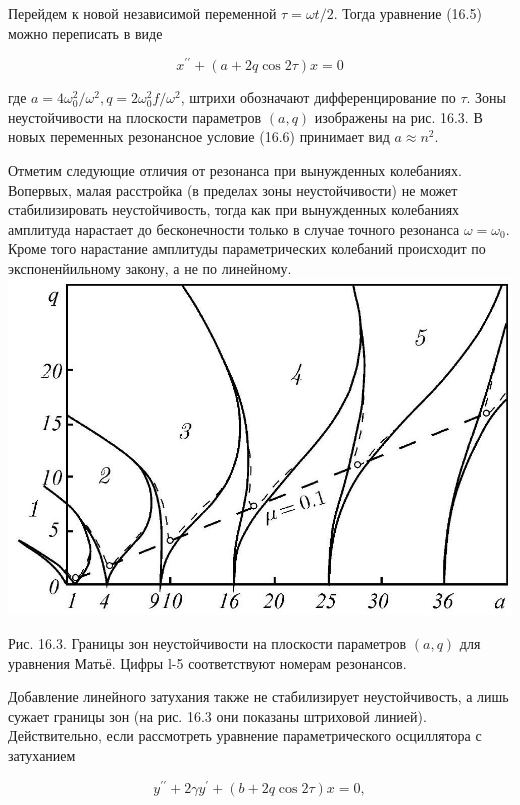 \documentclass[10pt]{article}
\begin{document}
Перейдем к новой независимой переменной $\tau=\omega t / 2$. Тогда уравнение (16.5) можно переписать в виде


\begin{equation*}
x^{\prime \prime}+(a+2 q \cos 2 \tau) x=0 \tag{16.7}
\end{equation*}


где $a=4 \omega_{0}^{2} / \omega^{2}, q=2 \omega_{0}^{2} f / \omega^{2}$, штрихи обозначают дифференцирование по $\tau$. Зоны неустойчивости на плоскости параметров $(a, q)$ изображены на рис. 16.3. В новых переменных резонансное условие (16.6) принимает вид $a \approx n^{2}$.

Отметим следующие отличия от резонанса при вынужденных колебаниях. Вопервых, малая расстройка (в пределах зоны неустойчивости) не может стабилизировать неустойчивость, тогда как при вынужденных колебаниях амплитуда нарастает до бесконечности только в случае точного резонанса $\omega=\omega_{0}$. Кроме того нарастание амплитуды параметрических колебаний происходит по экспоненйильному закону, а не по линейному.\\
\includegraphics[max width=\textwidth, center]{2024_12_13_864dea76193ac5d12698g-261}

Рис. 16.3. Границы зон неустойчивости на плоскости параметров $(a, q)$ для уравнения Матьё. Цифры l-5 соответствуют номерам резонансов.

Добавление линейного затухания также не стабилизирует неустойчивость, а лишь сужает границы зон (на рис. 16.3 они показаны штриховой линией). Действительно, если рассмотреть уравнение параметрического осциллятора с затуханием


\begin{equation*}
y^{\prime \prime}+2 \gamma y^{\prime}+(b+2 q \cos 2 \tau) x=0, \tag{16.8}
\end{equation*}
\end{document}
